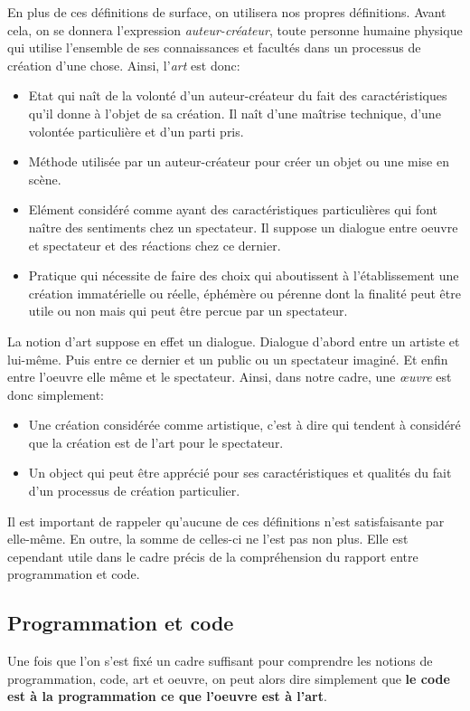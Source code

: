 \documentclass[12pt]{article} %
\begin{document}
En plus de ces définitions de surface, on utilisera nos propres définitions. Avant cela, on se donnera l'expression \textit{auteur-créateur}, toute personne humaine physique qui utilise l'ensemble de ses connaissances et facultés dans un processus de création d'une chose. Ainsi, l'\textit{art} est donc:
\begin{itemize}
    \item Etat qui naît de la volonté d'un auteur-créateur du fait des caractéristiques qu'il donne à l'objet de sa création. Il naît d'une maîtrise technique, d'une volontée particulière et d'un parti pris.
    \item Méthode utilisée par un auteur-créateur pour créer un objet ou une mise en scène.
    \item Elément considéré comme ayant des caractéristiques particulières qui font naître des sentiments chez un spectateur. Il suppose un dialogue entre oeuvre et spectateur et des réactions chez ce dernier.
    \item Pratique qui nécessite de faire des choix qui aboutissent à l'établissement une création immatérielle ou réelle, éphémère ou pérenne dont la finalité peut être utile ou non mais qui peut être percue par un spectateur.
\end{itemize}
La notion d'art suppose en effet un dialogue. Dialogue d'abord entre un artiste et lui-même. Puis entre ce dernier et un public ou un spectateur imaginé. Et enfin entre l'oeuvre elle même et le spectateur. Ainsi, dans notre cadre, une \textit{œuvre} est donc simplement:
\begin{itemize}
    \item Une création considérée comme artistique, c'est à dire qui tendent à considéré que la création est de l'art pour le spectateur.
    \item Un object qui peut être apprécié pour ses caractéristiques et qualités du fait d'un processus de création particulier.
\end{itemize}

Il est important de rappeler qu'aucune de ces définitions n'est satisfaisante par elle-même. En outre, la somme de celles-ci ne l'est pas non plus. Elle est cependant utile dans le cadre précis de la compréhension du rapport entre programmation et code.

\subsection{Programmation et code}
Une fois que l'on s'est fixé un cadre suffisant pour comprendre les notions de programmation, code, art et oeuvre, on peut alors dire simplement que \textbf{le code est à la programmation ce que l'oeuvre est à l'art}. 
\end{document}

